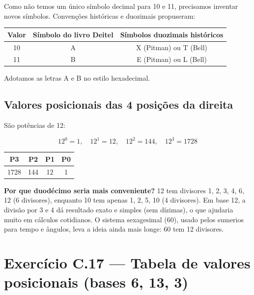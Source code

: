 \documentclass[11pt,a4paper]{article}
\begin{document}
Como n\~ao temos um \'unico s\'imbolo decimal para 10 e 11, precisamos inventar novos s\'imbolos. Conven\c{c}\~oes hist\'oricas e duozimais propuseram:

\begin{center}
\renewcommand{\arraystretch}{1.2}
\begin{tabular}{|c|c|c|}
\hline
\textbf{Valor} & \textbf{S\'imbolo do livro Deitel} & \textbf{S\'imbolos duozimais hist\'oricos} \\
\hline
10 & A & X (Pitman) ou T (Bell) \\
11 & B & E (Pitman) ou L (Bell) \\
\hline
\end{tabular}
\end{center}

Adotamos as letras A e B no estilo hexadecimal.

\subsection*{Valores posicionais das 4 posi\c{c}\~oes da direita}

S\~ao pot\^encias de 12:

\[
12^0 = \boxed{1}, \quad 12^1 = \boxed{12}, \quad 12^2 = \boxed{144}, \quad 12^3 = \boxed{1728}
\]

\begin{resposta}
\begin{center}
\begin{tabular}{|c|c|c|c|}
\hline
P3 & P2 & P1 & P0 \\
\hline
1728 & 144 & 12 & 1 \\
\hline
\end{tabular}
\end{center}
\end{resposta}

\begin{obseng}
\textbf{Por que duod\'ecimo seria mais conveniente?} 12 tem divisores 1, 2, 3, 4, 6, 12 (6 divisores), enquanto 10 tem apenas 1, 2, 5, 10 (4 divisores). Em base 12, a divis\~ao por 3 e 4 d\'a resultado exato e simples (sem d\'izimas), o que ajudaria muito em c\'alculos cotidianos. O sistema sexagesimal (60), usado pelos sumerios para tempo e \^angulos, leva a ideia ainda mais longe: 60 tem 12 divisores.
\end{obseng}

\section{Exerc\'icio C.17 --- Tabela de valores posicionais (bases 6, 13, 3)}
\end{document}
